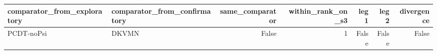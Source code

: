 \begin{tabular}{llrrrrr}
\toprule
comparator\_from\_exploratory & comparator\_from\_confirmatory & same\_comparator & within\_rank\_on\_s3 & leg1 & leg2 & divergence \\
\midrule
PCDT-noPsi & DKVMN & False & 1 & False & False & False \\
\bottomrule
\end{tabular}

